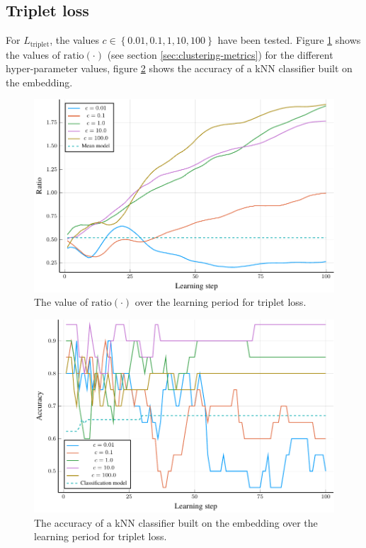 \subsection{Triplet loss}
For \( L_\mathrm{triplet} \), the values \( c \in \left\{ 0.01, 0.1, 1, 10, 100 \right\} \) have been tested. Figure \ref{fig:triplet-gridsearch-ratio} shows the values of \( \mathrm{ratio} \left( \cdot \right) \) (see section \ref{sec:clustering-metrics}) for the different hyper-parameter values, figure \ref{fig:triplet-gridsearch-accuracy} shows the accuracy of a kNN classifier built on the embedding.

\begin{figure}[h]
  \centering
  \includegraphics[width=\textwidth]{images/triplet-gridsearch/ratio/triplet-gridsearch-ratio.pdf}
  \caption{The value of \( \mathrm{ratio} \left( \cdot \right) \) over the learning period for triplet loss.}\label{fig:triplet-gridsearch-ratio}
\end{figure}

\begin{figure}[h]
  \centering
  \includegraphics[width=\textwidth]{images/triplet-gridsearch/accuracy/triplet-gridsearch-accuracy.pdf}
  \caption{The accuracy of a kNN classifier built on the embedding over the learning period for triplet loss.}\label{fig:triplet-gridsearch-accuracy}
\end{figure}

